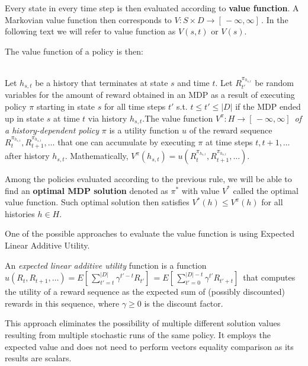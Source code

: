 Every state in every time step is then evaluated according to \textbf{value function}. A Markovian value function then corresponds to $ V: S \times D 
\rightarrow [ \,-\infty, \infty] \,$. In the following text we will refer to value function as $V(s, t)$ or $V(s)$.

The value function of a policy is then: \\ \\

\begin{definition}
Let $h_{s,t}$ be a history that terminates at state $s$ and time $t$. Let $R^{\pi_{h_{s,t}}}_{t'}$ be random variables for the amount of reward obtained in an MDP as a result of executing policy $\pi$ starting in state $s$ for all time steps $t'$ s.t. $t \leqslant t' \leqslant |D|$ if the MDP ended up in state $s$ at time $t$ via history $h_{s,t}$.The value function $V^{\pi}: H \rightarrow [ \,−\infty,\infty] \,$ \textit{of a history-dependent policy} $\pi$ is a utility function $u$ of the reward sequence $R^{\pi_{h_{s,t}}}_t, R^{\pi_{h_{s,t}}}_{t+1}, \ldots$ that one can accumulate by executing $\pi$ at time steps $t, t + 1,\ldots$  after history $h_{s,t}$. Mathematically, $V^{\pi} (h_{s,t}) = u(R^{\pi_{h_{s,t}}}_t , R^{\pi_{h_{s,t}}}_{t+1}, \ldots)$.
\end{definition}

Among the policies evaluated according to the previous rule, we will be able to find an \textbf{optimal MDP solution} denoted as $\pi^*$ with value $V^*$ called the optimal value function. Such optimal solution then satisfies $V^{*} (h) \leqslant V^{\pi} (h)$ for all histories $h \in H$.

One of the possible approaches to evaluate the value function is using Expected Linear Additive Utility.
\\
\begin{definition}
An \textit{expected linear additive utility} function is a function $u(R_t, R_{t+1}, \ldots) = E[ \,\sum_{t'=t}^{|D|} \gamma ^{t'−t} R_{t'}] \, = E[ \,\sum_{t'=0}^{|D|-t} \gamma^{t'} R_{t'+t}] \,$ that computes the utility of a
reward sequence as the expected sum of (possibly discounted) rewards in this sequence, where $\gamma \geqslant 0$
is the discount factor.
\end{definition}

This approach eliminates the possibility of multiple different solution values resulting from multiple stochastic runs of the same policy. It employs the expected value and does not need to perform vectors equality comparison as its results are scalars.

